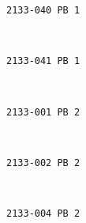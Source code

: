 \documentclass[11pt]{article}
\begin{document}
    \begin{Verbatim}[commandchars=\\\{\}]
2133-040 PB 1

    \end{Verbatim}

    \begin{center}
    \end{center}
    { \hspace*{\fill} \\}
    
    \begin{Verbatim}[commandchars=\\\{\}]
2133-041 PB 1

    \end{Verbatim}

    \begin{center}
    \end{center}
    { \hspace*{\fill} \\}
    
    \begin{Verbatim}[commandchars=\\\{\}]
2133-001 PB 2

    \end{Verbatim}

    \begin{center}
    \end{center}
    { \hspace*{\fill} \\}
    
    \begin{Verbatim}[commandchars=\\\{\}]
2133-002 PB 2

    \end{Verbatim}

    \begin{center}
    \end{center}
    { \hspace*{\fill} \\}
    
    \begin{Verbatim}[commandchars=\\\{\}]
2133-004 PB 2

    \end{Verbatim}
\end{document}
